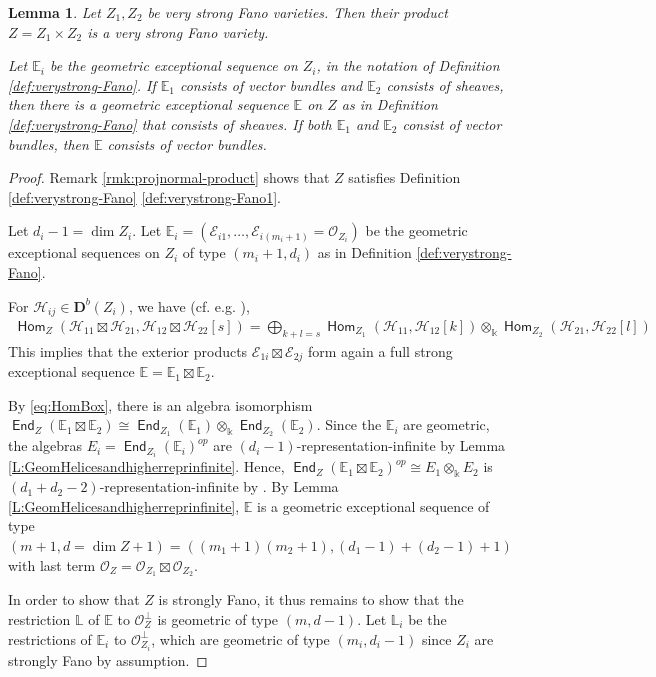 \documentclass[a4paper,11pt, reqno]{amsart}
\def\E{\mathbb E}
\def\L{\mathbb L}
\def\DD{\mathbf D}
\def\OO{\mathcal O}
\def\sE{\mathscr{E}}
\def\sH{\mathscr{H}}
\newcommand{\opname}[1]{\operatorname{\mathsf{#1}}}
\newcommand{\Hom}{\opname{Hom}}
\newcommand{\End}{\opname{End}}
\newcommand{\op}{^{op}}
\def\Db{\DD^b}
\theoremstyle{plain}
\newtheorem{lemma}[dummy]{Lemma}
\theoremstyle{definition}
\numberwithin{equation}{section}
\begin{document}
\begin{lemma} \label{L:productsofgeom}
    Let $Z_1, Z_2$ be very strong Fano
    varieties. Then their product $Z=Z_1 \times Z_2$ is a very strong Fano
    variety.

  
    Let $\E_i$ be the geometric exceptional sequence on $Z_i$, in the notation of Definition \ref{def:verystrong-Fano}. 
    If $\E_1$ consists of vector bundles and $\E_2$ consists of sheaves, then there is a geometric exceptional sequence $\E$ on $Z$ as in Definition \ref{def:verystrong-Fano} that consists of sheaves. If both $\E_1$ and $\E_2$ consist of vector bundles, then $\E$ consists of vector bundles.
\end{lemma}
\begin{proof} 
Remark \ref{rmk:projnormal-product} shows that $Z$ satisfies Definition \ref{def:verystrong-Fano} \eqref{def:verystrong-Fano1}. 

Let $d_i-1=\dim Z_i$.
Let $\E_i=(\sE_{i1}, \ldots, \sE_{i(m_i+1)}=\OO_{Z_i})$ be the geometric exceptional sequences on $Z_i$ of type $(m_i+1, d_i)$ as in  Definition \ref{def:verystrong-Fano}.



For $\sH_{ij} \in \Db(Z_i)$, we have (cf. e.g. \cite[Proof of Lemma 5.2]{Uehara}),
\begin{align} \label{eq:HomBox}
  \Hom_Z(\sH_{11} \boxtimes \sH_{21}, \sH_{12} \boxtimes \sH_{22}[s]) =\bigoplus_{k+l=s} \Hom_{Z_1}( \sH_{11}, \sH_{12} [k]) \otimes_{\mathbb{k}}  \Hom_{Z_2}( \sH_{21}, \sH_{22} [l]) 
\end{align}
This implies that the exterior products $\sE_{1i}\boxtimes\sE_{2j}$ form again a full strong exceptional sequence $\E=\E_1 \boxtimes \E_2$. 


By \eqref{eq:HomBox}, there is an algebra isomorphism $\End_Z(\E_1 \boxtimes\E_2) \cong \End_{Z_1}(\E_1) \otimes_{\mathbb{k}} \End_{Z_2}(\E_2)$. Since the $\E_i$ are geometric, the algebras $E_i=\End_{Z_i}(\E_i)\op$ are $(d_i-1)$-representation-infinite by Lemma \ref{L:GeomHelicesandhigherreprinfinite}. Hence, $\End_Z(\E_1 \boxtimes\E_2)\op \cong E_1 \otimes_{\mathbb{k}} E_2$ is $(d_1+d_2 -2)$-representation-infinite by \cite[Theorem 2.10]{HIO}. By Lemma \ref{L:GeomHelicesandhigherreprinfinite}, $\E$ is a geometric exceptional sequence of type $(m+1, d=\dim Z +1)=((m_1+1)(m_2+1), (d_1-1)+(d_2-1)+1)$ with last term $\mathcal{O}_Z=\mathcal{O}_{Z_1} \boxtimes \mathcal{O}_{Z_2}$. 

In order to show that $Z$ is strongly Fano, it thus remains to show that the restriction $\L$ of $\E$ to $\OO_Z^\perp$ is geometric of type $(m, d-1)$. Let $\L_i$ be the restrictions of $\E_i$ to 
$\OO_{Z_i}^\perp$, which are geometric of type $(m_i, d_i-1)$ since $Z_i$ are strongly Fano by assumption.


\end{proof}
\end{document}
